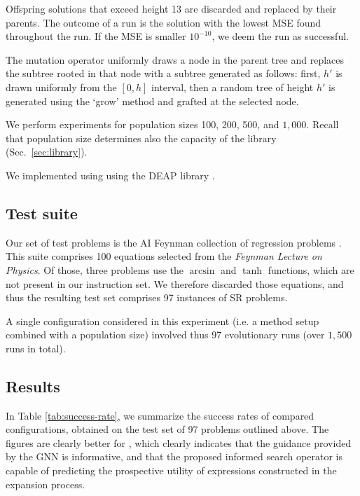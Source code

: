 Offspring solutions that exceed height 13 are discarded and replaced by their parents. The outcome of a run is the solution with the lowest MSE found throughout the run. If the MSE is smaller $10^{-10}$, we deem the run as successful.


The mutation operator uniformly draws a node in the parent tree and replaces the subtree rooted in that node with a subtree generated as follows: first, $h'$ is drawn uniformly from the $[0,h]$ interval, then a random tree of height $h'$ is generated using the `grow' method and grafted at the selected node. 

We perform experiments for population sizes 100, 200, 500, and $1{,}000$. Recall that population size determines also the capacity of the library (Sec.\ \ref{sec:library}).  

We implemented \mname using using the DEAP library \cite{DEAP_JMLR2012}.


\subsection{Test suite}\label{sec:test-set}

Our set of test problems is the AI Feynman collection of regression problems \cite{Udrescu_Tegmark_2020}. This suite comprises 100 equations selected from the \emph{Feynman Lecture on Physics}. Of those, three problems use the $\arcsin$ and $\tanh$ functions, which are not present in our instruction set. We therefore discarded those equations, and thus the resulting test set comprises 97 instances of SR problems.  

A single configuration considered in this experiment (i.e. a method setup combined with a population size) involved thus 97 evolutionary runs (over $1{,}500$ runs in total). 

\subsection{Results}\label{sec:results}

In Table \ref{tab:success-rate}, we summarize the success rates of compared configurations, obtained on the test set of 97 problems outlined above. The figures are clearly better for \mname, which clearly indicates that the guidance provided by the GNN is informative, and that the proposed informed search operator is capable of predicting the prospective utility of expressions constructed in the expansion process.  

